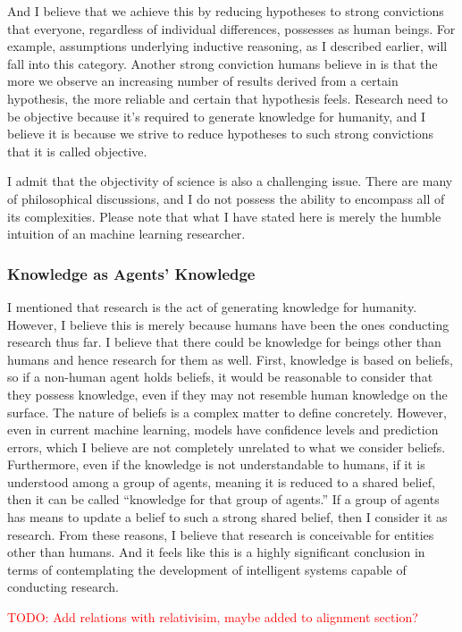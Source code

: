 \documentclass{book}
\begin{document}
And I believe that we achieve this by reducing hypotheses to strong convictions that everyone, regardless of individual differences, possesses as human beings. For example, assumptions underlying inductive reasoning, as I described earlier, will fall into this category. Another strong conviction humans believe in is that the more we observe an increasing number of results derived from a certain hypothesis, the more reliable and certain that hypothesis feels. Research need to be objective because it's required to generate knowledge for humanity, and I believe it is because we strive to reduce hypotheses to such strong convictions that it is called objective. 

I admit that the objectivity of science is also a challenging issue. There are many of philosophical discussions, and I do not possess the ability to encompass all of its complexities. Please note that what I have stated here is merely the humble intuition of an machine learning researcher.

\subsubsection{Knowledge as Agents' Knowledge}
I mentioned that research is the act of generating knowledge for humanity. However, I believe this is merely because humans have been the ones conducting research thus far. I believe that there could be knowledge for beings other than humans and hence research for them as well. First, knowledge is based on beliefs, so if a non-human agent holds beliefs, it would be reasonable to consider that they possess knowledge, even if they may not resemble human knowledge on the surface. The nature of beliefs is a complex matter to define concretely. However, even in current machine learning, models have confidence levels and prediction errors, which I believe are not completely unrelated to what we consider beliefs. Furthermore, even if the knowledge is not understandable to humans, if it is understood among a group of agents, meaning it is reduced to a shared belief, then it can be called ``knowledge for that group of agents.'' If a group of agents has means to update a belief to such a strong shared belief, then I consider it as research. From these reasons, I believe that research is conceivable for entities other than humans. And it feels like this is a highly significant conclusion in terms of contemplating the development of intelligent systems capable of conducting research.

\textcolor{red}{TODO: Add relations with relativisim, maybe added to alignment section?}
\end{document}
